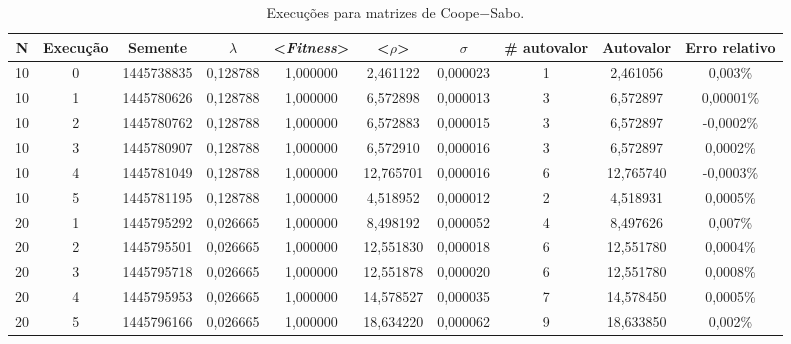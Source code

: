 \newpage
\begin{landscape}
\begin{center}
\begin{table}[htbp]
\caption{Execuções para matrizes de Coope$-$Sabo.}
\label{tab:execucoes10a40}
\begin{tabular}{cccccccccc}
\hline \hline
   \textbf{N} & \textbf{Execução} & \textbf{Semente} & \textbf{$\lambda$} & \textbf{<\textit{Fitness}>} & \textbf{<$\rho$>} & \textbf{$\sigma$} & \textbf{\# autovalor} & \textbf{Autovalor} & \textbf{Erro relativo} \\
\hline \hline
        10 &          0 & 1445738835 &   0,128788 &   1,000000 &   2,461122 &   0,000023 &          1 &   2,461056 &    0,003\% \\
\hline
        10 &          1 & 1445780626 &   0,128788 &   1,000000 &   6,572898 &   0,000013 &          3 &   6,572897 &  0,00001\% \\
\hline
        10 &          2 & 1445780762 &   0,128788 &   1,000000 &   6,572883 &   0,000015 &          3 &   6,572897 &  -0,0002\% \\
\hline
        10 &          3 & 1445780907 &   0,128788 &   1,000000 &   6,572910 &   0,000016 &          3 &   6,572897 &   0,0002\% \\
\hline
        10 &          4 & 1445781049 &   0,128788 &   1,000000 &  12,765701 &   0,000016 &          6 &  12,765740 &  -0,0003\% \\
\hline
        10 &          5 & 1445781195 &   0,128788 &   1,000000 &   4,518952 &   0,000012 &          2 &   4,518931 &   0,0005\% \\
\hline
        20 &          1 & 1445795292 &   0,026665 &   1,000000 &   8,498192 &   0,000052 &          4 &   8,497626 &    0,007\% \\
\hline
        20 &          2 & 1445795501 &   0,026665 &   1,000000 &  12,551830 &   0,000018 &          6 &  12,551780 &   0,0004\% \\
\hline
        20 &          3 & 1445795718 &   0,026665 &   1,000000 &  12,551878 &   0,000020 &          6 &  12,551780 &   0,0008\% \\
\hline
        20 &          4 & 1445795953 &   0,026665 &   1,000000 &  14,578527 &   0,000035 &          7 &  14,578450 &   0,0005\% \\
\hline
        20 &          5 & 1445796166 &   0,026665 &   1,000000 &  18,634220 &   0,000062 &          9 &  18,633850 &    0,002\% \\

\end{tabular}
\end{table}
\end{center}
\end{landscape}
